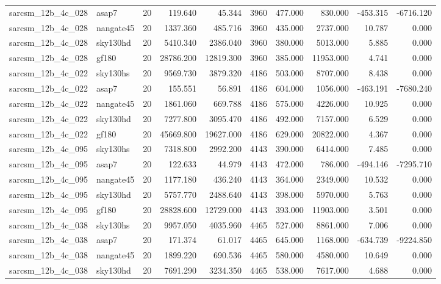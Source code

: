 \documentclass{article}
\begin{document}
\begin{longtable}{llrrrrrrrr}
sarcsm\_12b\_4c\_028 & asap7 & 20 & 119.640 & 45.344 & 3960 & 477.000 & 830.000 & -453.315 & -6716.120 \\
sarcsm\_12b\_4c\_028 & nangate45 & 20 & 1337.360 & 485.716 & 3960 & 435.000 & 2737.000 & 10.787 & 0.000 \\
sarcsm\_12b\_4c\_028 & sky130hd & 20 & 5410.340 & 2386.040 & 3960 & 380.000 & 5013.000 & 5.885 & 0.000 \\
sarcsm\_12b\_4c\_028 & gf180 & 20 & 28786.200 & 12819.300 & 3960 & 385.000 & 11953.000 & 4.741 & 0.000 \\
sarcsm\_12b\_4c\_022 & sky130hs & 20 & 9569.730 & 3879.320 & 4186 & 503.000 & 8707.000 & 8.438 & 0.000 \\
sarcsm\_12b\_4c\_022 & asap7 & 20 & 155.551 & 56.891 & 4186 & 604.000 & 1056.000 & -463.191 & -7680.240 \\
sarcsm\_12b\_4c\_022 & nangate45 & 20 & 1861.060 & 669.788 & 4186 & 575.000 & 4226.000 & 10.925 & 0.000 \\
sarcsm\_12b\_4c\_022 & sky130hd & 20 & 7277.800 & 3095.470 & 4186 & 492.000 & 7157.000 & 6.529 & 0.000 \\
sarcsm\_12b\_4c\_022 & gf180 & 20 & 45669.800 & 19627.000 & 4186 & 629.000 & 20822.000 & 4.367 & 0.000 \\
sarcsm\_12b\_4c\_095 & sky130hs & 20 & 7318.800 & 2992.200 & 4143 & 390.000 & 6414.000 & 7.485 & 0.000 \\
sarcsm\_12b\_4c\_095 & asap7 & 20 & 122.633 & 44.979 & 4143 & 472.000 & 786.000 & -494.146 & -7295.710 \\
sarcsm\_12b\_4c\_095 & nangate45 & 20 & 1177.180 & 436.240 & 4143 & 364.000 & 2349.000 & 10.532 & 0.000 \\
sarcsm\_12b\_4c\_095 & sky130hd & 20 & 5757.770 & 2488.640 & 4143 & 398.000 & 5970.000 & 5.763 & 0.000 \\
sarcsm\_12b\_4c\_095 & gf180 & 20 & 28828.600 & 12729.000 & 4143 & 393.000 & 11903.000 & 3.501 & 0.000 \\
sarcsm\_12b\_4c\_038 & sky130hs & 20 & 9957.050 & 4035.960 & 4465 & 527.000 & 8861.000 & 7.006 & 0.000 \\
sarcsm\_12b\_4c\_038 & asap7 & 20 & 171.374 & 61.017 & 4465 & 645.000 & 1168.000 & -634.739 & -9224.850 \\
sarcsm\_12b\_4c\_038 & nangate45 & 20 & 1899.220 & 690.536 & 4465 & 580.000 & 4580.000 & 10.649 & 0.000 \\
sarcsm\_12b\_4c\_038 & sky130hd & 20 & 7691.290 & 3234.350 & 4465 & 538.000 & 7617.000 & 4.688 & 0.000 \\

\end{longtable}
\end{document}
